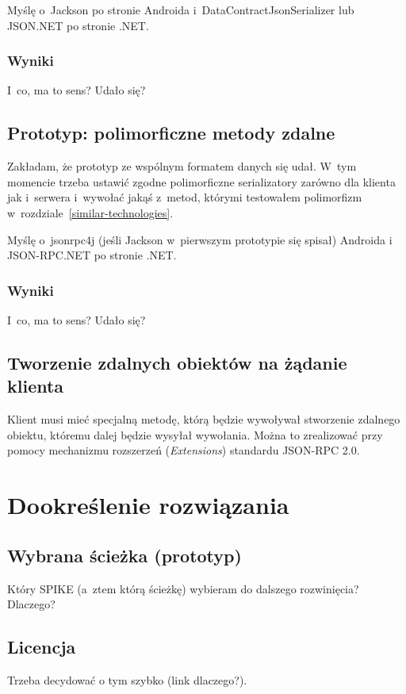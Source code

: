 Myślę o~Jackson po stronie Androida i~DataContractJsonSerializer lub JSON.NET po stronie .NET\@.

\subsubsection{Wyniki}
I~co, ma to sens? Udało się?


\subsection{Prototyp: polimorficzne metody zdalne}
Zakładam, że prototyp ze wspólnym formatem danych się udał.
W~tym momencie trzeba ustawić zgodne polimorficzne serializatory zarówno dla klienta jak i~serwera i~wywołać jakąś z~metod, którymi testowałem polimorfizm w~rozdziale~\ref{similar-technologies}.

Myślę o~jsonrpc4j (jeśli Jackson w~pierwszym prototypie się spisał) Androida i JSON-RPC.NET po stronie .NET\@.

\subsubsection{Wyniki}
I~co, ma to sens? Udało się?

\subsection{Tworzenie zdalnych obiektów na żądanie klienta}
Klient musi mieć specjalną metodę, którą będzie wywoływał stworzenie zdalnego obiektu, któremu dalej będzie wysyłał wywołania.
Można to zrealizować przy pomocy mechanizmu rozszerzeń (\emph{Extensions}) standardu JSON-RPC 2.0.


\section{Dookreślenie rozwiązania}
\subsection{Wybrana ścieżka (prototyp)}
Który SPIKE (a~ztem którą ścieżkę) wybieram do dalszego rozwinięcia?
Dlaczego?

\subsection{Licencja}
Trzeba decydować o tym szybko (link dlaczego?).


